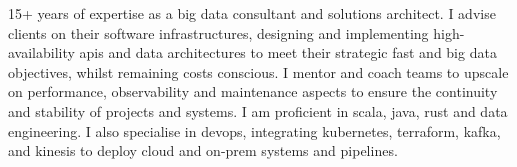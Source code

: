 

\begin{cvparagraph}

15+ years of expertise as a big data consultant and solutions architect.
I advise clients on their software infrastructures, designing and implementing high-availability apis and data architectures to meet their strategic fast and big data objectives, whilst remaining costs conscious.
I mentor and coach teams to upscale on performance, observability and maintenance aspects to ensure the continuity and stability of projects and systems.
I am proficient in scala, java, rust and data engineering.
I also specialise in devops, integrating kubernetes, terraform, kafka, and kinesis to deploy cloud and on-prem systems and pipelines.
\end{cvparagraph}

